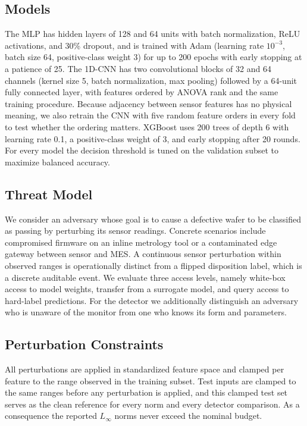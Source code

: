 \documentclass[preprint,12pt,authoryear]{elsarticle}
\begin{document}
\subsection{Models}
The MLP has hidden layers of 128 and 64 units with batch normalization, ReLU activations, and 30\% dropout, and is trained with Adam (learning rate $10^{-3}$, batch size 64, positive-class weight 3) for up to 200 epochs with early stopping at a patience of 25. The 1D-CNN has two convolutional blocks of 32 and 64 channels (kernel size 5, batch normalization, max pooling) followed by a 64-unit fully connected layer, with features ordered by ANOVA rank and the same training procedure. Because adjacency between sensor features has no physical meaning, we also retrain the CNN with five random feature orders in every fold to test whether the ordering matters. XGBoost uses 200 trees of depth 6 with learning rate 0.1, a positive-class weight of 3, and early stopping after 20 rounds. For every model the decision threshold is tuned on the validation subset to maximize balanced accuracy.

\subsection{Threat Model}
We consider an adversary whose goal is to cause a defective wafer to be classified as passing by perturbing its sensor readings. Concrete scenarios include compromised firmware on an inline metrology tool or a contaminated edge gateway between sensor and MES. A continuous sensor perturbation within observed ranges is operationally distinct from a flipped disposition label, which is a discrete auditable event. We evaluate three access levels, namely white-box access to model weights, transfer from a surrogate model, and query access to hard-label predictions. For the detector we additionally distinguish an adversary who is unaware of the monitor from one who knows its form and parameters.

\subsection{Perturbation Constraints}
All perturbations are applied in standardized feature space and clamped per feature to the range observed in the training subset. Test inputs are clamped to the same ranges before any perturbation is applied, and this clamped test set serves as the clean reference for every norm and every detector comparison. As a consequence the reported $L_\infty$ norms never exceed the nominal budget.
\end{document}
